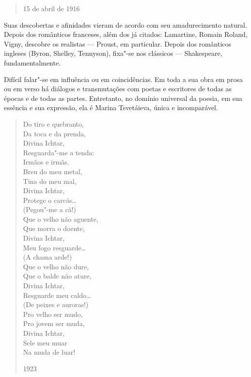 {\begin{verse}
15 de abril de 1916

\end{verse}

Suas descobertas e afinidades vieram de acordo com seu amadurecimento
natural. Depois dos românticos franceses, além dos já citados:
Lamartine, Romain Roland, Vigny, descobre os realistas --- Proust, em
particular. Depois dos românticos ingleses (Byron, Shelley, Tennyson),
fixa"-se nos clássicos --- Shakespeare, fundamentalmente.

Difícil falar"-se em influência ou em coincidências. Em toda a sua obra
em prosa ou em verso há diálogos e transmutações com poetas e escritores
de todas as épocas e de todas as partes. Entretanto, no domínio
universal da poesia, em sua essência e sua expressão, ela é Marina
Tsvetáieva, única e incomparável.

\begin{verse}
Do tiro e quebranto, \\
Da toca e da prenda, \\
Divina Ichtar, \\
Resguarda"-me a tenda: \\[8pt]
Irmãos e irmãs. \\
Breu do meu metal, \\
Tina do meu mal, \\
Divina Ichtar, \\
Protege o carcás\ldots{} \\[8pt]
(Pegou"-me a cã!) \\[8pt]
Que o velho não aguente, \\
Que morra o doente, \\
Divina Ichtar, \\
Meu fogo resguarde\ldots{} \\[8pt]
(A chama arde!) \\[8pt]
Que o velho não dure, \\
Que o balde não ature, \\
Divina Ichtar, \\
Resguarde meu caldo\ldots{} \\[8pt]
(De peixes e auroras!) \\[8pt]
Pro velho ser mudo, \\
Pro jovem ser muda, \\
Divina Ichtar, \\
Sele meu muar \\
Na muda de luar!

1923

\end{verse}

}
